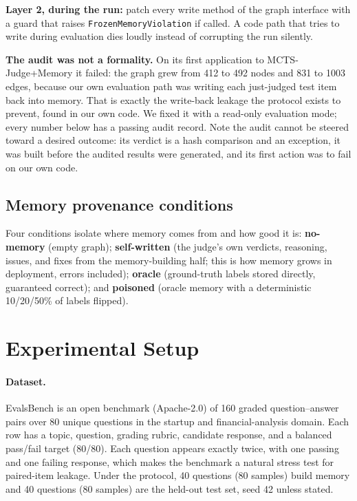 \documentclass[11pt]{article}
\begin{document}
\textbf{Layer 2, during the run:} patch every write method of the graph interface with a guard that raises \texttt{FrozenMemoryViolation} if called. A code path that tries to write during evaluation dies loudly instead of corrupting the run silently.

\textbf{The audit was not a formality.} On its first application to MCTS-Judge+Memory it failed: the graph grew from 412 to 492 nodes and 831 to 1003 edges, because our own evaluation path was writing each just-judged test item back into memory. That is exactly the write-back leakage the protocol exists to prevent, found in our own code. We fixed it with a read-only evaluation mode; every number below has a passing audit record. Note the audit cannot be steered toward a desired outcome: its verdict is a hash comparison and an exception, it was built before the audited results were generated, and its first action was to fail on our own code.

\subsection{Memory provenance conditions}

Four conditions isolate where memory comes from and how good it is: \textbf{no-memory} (empty graph); \textbf{self-written} (the judge's own verdicts, reasoning, issues, and fixes from the memory-building half; this is how memory grows in deployment, errors included); \textbf{oracle} (ground-truth labels stored directly, guaranteed correct); and \textbf{poisoned} (oracle memory with a deterministic 10/20/50\% of labels flipped).

\section{Experimental Setup}
\label{sec:setup}

\paragraph{Dataset.} EvalsBench \citep{evalsbench2024} is an open benchmark (Apache-2.0) of 160 graded question--answer pairs over 80 unique questions in the startup and financial-analysis domain. Each row has a topic, question, grading rubric, candidate response, and a balanced pass/fail target (80/80). Each question appears exactly twice, with one passing and one failing response, which makes the benchmark a natural stress test for paired-item leakage. Under the protocol, 40 questions (80 samples) build memory and 40 questions (80 samples) are the held-out test set, seed 42 unless stated.
\end{document}
